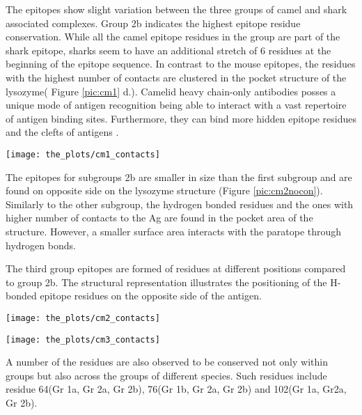 \documentclass{article}
\begin{document}
The epitopes show slight variation between the three groups of camel and shark associated complexes. Group 2b indicates the highest epitope residue conservation. While all the camel epitope residues in the group are part of the shark epitope, sharks seem to have an additional stretch of 6 residues at the beginning of the epitope sequence. In contrast to the mouse epitopes, the residues with the highest number of contacts are clustered in the pocket structure of the lysozyme( Figure \ref{pic:cm1} d.). Camelid heavy chain-only antibodies posses a unique mode of antigen recognition being able to interact with a vast repertoire of antigen binding sites. Furthermore, they can bind more hidden epitope residues and the clefts of antigens \cite{Desmyter1996} \cite{Stanfield2004}. 
\begin{center}
	\texttt{[image: the\_plots/cm1\_contacts]}
	 \label{pic:cm1} %
\end{center}
The epitopes for subgroups 2b are smaller in size than the first subgroup and are found on opposite side on the lysozyme structure (Figure \ref{pic:cm2nocon}). Similarly to the other subgroup, the hydrogen bonded residues and the ones with higher number of contacts to the Ag are found in the pocket area of the structure. However, a smaller surface area  interacts with the paratope through hydrogen bonds.

The third group epitopes are formed of residues at different positions compared to group 2b. The structural representation illustrates the positioning of the H-bonded epitope residues on the opposite side of the antigen.
\begin{center}
	\texttt{[image: the\_plots/cm2\_contacts]}
	 \label{pic:cm2nocon} %
\end{center}
\begin{center}
	\texttt{[image: the\_plots/cm3\_contacts]}
	 \label{pic:cm3nocon} %
\end{center}



A number of the residues are also observed to be conserved not only within groups but also across the groups of different species. Such residues include residue 64(Gr 1a, Gr 2a, Gr 2b), 76(Gr 1b, Gr 2a, Gr 2b) and 102(Gr 1a, Gr2a, Gr 2b). 
\end{document}
